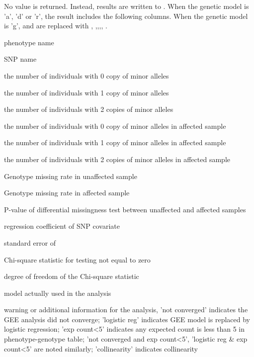 \begin{Value}
No value is returned. Instead, results are written to .
When the genetic model is 'a', 'd' or 'r', the result includes the following columns.
When the genetic model is 'g',  and  are replaced with ,
,,,, .

\begin{ldescription}
\item[\code{phen }] phenotype name
\item[\code{snp }] SNP name
\item[\code{n0 }] the number of individuals with 0 copy of minor alleles
\item[\code{n1 }] the number of individuals with 1 copy of minor alleles
\item[\code{n2 }] the number of individuals with 2 copies of minor alleles
\item[\code{nd0 }] the number of individuals with 0 copy of minor alleles in affected sample
\item[\code{nd1 }] the number of individuals with 1 copy of minor alleles in affected sample
\item[\code{nd2 }] the number of individuals with 2 copies of minor alleles in affected sample
\item[\code{miss.0 }] Genotype missing rate in unaffected sample 
\item[\code{miss.1 }] Genotype missing rate in affected sample 
\item[\code{miss.diff.p }] P-value of differential missingness test between unaffected and affected samples 
\item[\code{beta }] regression coefficient of SNP covariate
\item[\code{se }] standard error of 
\item[\code{chisq }] Chi-square statistic for testing  not equal to zero
\item[\code{df }] degree of freedom of the Chi-square statistic
\item[\code{model }] model actually used in the analysis
\item[\code{remark }] warning or additional information for the analysis, 'not converged' indicates the 
GEE analysis did not converge; 'logistic reg' indicates GEE model is replaced by logistic regression;
'exp count<5' indicates any expected count is less than 5 in phenotype-genotype table; 'not converged 
and exp count<5', 'logistic reg \& exp count<5' are noted similarly; 'collinearity' indicates collinearity

\end{ldescription}
\end{Value}
